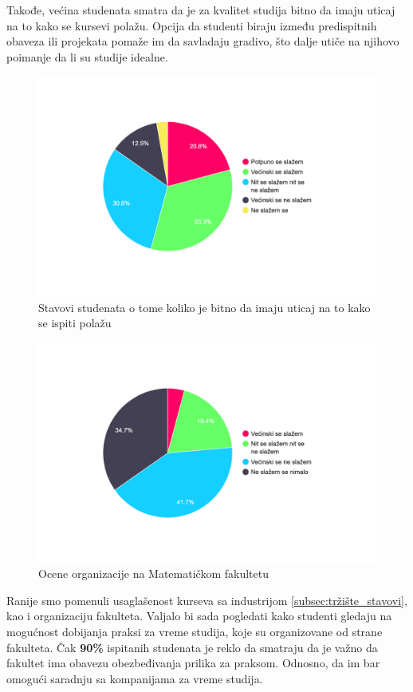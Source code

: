 \documentclass[a4paper]{article}
\begin{document}
{Takođe, većina studenata smatra da je za kvalitet studija bitno da imaju uticaj na to kako se kursevi polažu. Opcija da studenti biraju između predispitnih obaveza ili projekata pomaže im da savladaju gradivo, što dalje utiče na njihovo poimanje da li su studije idealne.
\begin{figure}[h!]
\begin{center}
    \includegraphics[width=0.7\linewidth]{Slike/PieChartNacinPolaganja.png}
    \caption{Stavovi studenata o tome koliko je bitno da imaju uticaj na to kako se ispiti polažu}
    \label{fig:uticaj}
\end{center}
\end{figure}


\begin{figure}[h!]
\begin{center}
    \includegraphics[width=0.7\linewidth]{Slike/PieChartOrganizacijaMatfa.png}
    \caption{Ocene organizacije na Matematičkom fakultetu}
    \label{fig:organizacija_matf}
\end{center}
\end{figure}

Ranije smo pomenuli usaglašenost kurseva sa industrijom \ref{subsec:tržište_stavovi}, kao i organizaciju fakulteta. Valjalo bi sada pogledati kako studenti gledaju na mogućnost dobijanja praksi za vreme studija, koje su organizovane od strane fakulteta. Čak \textbf{90\%} ispitanih studenata je reklo da smatraju da je važno da fakultet ima obavezu obezbeđivanja prilika za praksom. Odnosno, da im bar omogući saradnju sa kompanijama za vreme studija.

}
\end{document}
